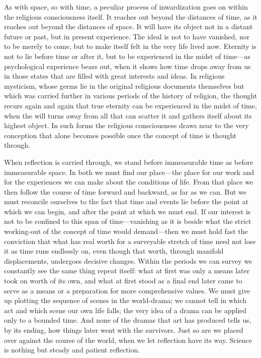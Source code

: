 \documentclass[12pt,a4paper]{article}
\newcommand{\opage}[1]{\marginnote{\footnotesize\textit{[#1]}}}
\begin{document}
As with space, so with time, a peculiar process of inwardization goes on within the
religious consciousness itself. It reaches out beyond the distances of time, as it
reaches out beyond the distances of space. It will have its object not in a distant
future or past, but in present experience. The ideal \opage{16}is not to have vanished, nor
to be merely to come, but to make itself felt in the very life lived now. Eternity
is not to lie before time or after it, but to be experienced in the midst of
time---as psychological experience bears out, when it shows how time drops away from
us in those states that are filled with great interests and ideas. In religious
mysticism, whose germs lie in the original religious documents themselves but which
was carried further in various periods of the history of religion, the thought
recurs again and again that true eternity can be experienced in the midst of time,
when the will turns away from all that can scatter it and gathers itself about its
highest object. In such forms the religious consciousness draws near to the very
conception that alone becomes possible once the concept of time is thought through.

When reflection is carried through, we stand before immeasurable time as before
immeasurable space. In both we must find our place---the place for our work and for
the experiences we can make about the conditions of life. From that place we then
follow the course of time forward and backward, as far as we can. But we must
reconcile ourselves to the fact that time and events lie before the point at which
we can begin, and after the point at which we must end. If our interest is not to be
confined to this span of time---vanishing as it is beside what the strict working-out
of the concept of time would demand---then we must hold fast the conviction that what
has real worth for a surveyable stretch of time need not lose it as time runs
endlessly on, even though that worth, through manifold displacements, undergoes
decisive changes. Within the periods we can survey we constantly see the same thing
repeat itself: what at first was only a means later took on worth of its own, and what
at first stood as a final end later came to serve as a means or a \opage{17}preparation for more
comprehensive values. We must give up plotting the sequence of scenes in the
world-drama; we cannot tell in which act and which scene our own life falls; the very
idea of a drama can be applied only to a bounded time. And none of the dramas that art
has produced tells us, by its ending, how things later went with the survivors. Just
so are we placed over against the course of the world, when we let reflection have its
way. Science is nothing but steady and patient reflection.
\end{document}
